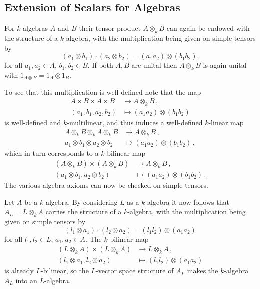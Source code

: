 \subsection{Extension of Scalars for Algebras}


\begin{fluff}
  For $k$-algebras $A$ and $B$ their tensor product $A \otimes_k B$ can again be endowed with the structure of a $k$-algebra, with the multiplication being given on simple tensors by
  \[
      (a_1 \otimes b_1) \cdot (a_2 \otimes b_2)
    = (a_1 a_2) \otimes (b_1 b_2).
  \]
  for all $a_1, a_2 \in A$, $b_1, b_2 \in B$.
  If both $A, B$ are unital then $A \otimes_k B$ is again unital with $1_{A \otimes B} = 1_A \otimes 1_B$.
  
  To see that this multiplication is well-defined note that the map
  \begin{align*}
              A \times B \times A \times B
    &\to      A \otimes_k B \,, \\
              (a_1, b_1, a_2, b_2)
    &\mapsto  (a_1 a_2) \otimes (b_1 b_2)
  \end{align*}
  is well-defined and $k$-multilinear, and thus induces a well-defined $k$-linear map
  \begin{align*}
              A \otimes_k B \otimes_k A \otimes_k B
    &\to      A \otimes_k B \,, \\
              a_1 \otimes b_1 \otimes a_2 \otimes b_2
    &\mapsto  (a_1 a_2) \otimes (b_1 b_2) \,,
  \end{align*}
  which in turn corresponds to a $k$-bilinear map
  \begin{align*}
              (A \otimes_k B) \times (A \otimes_k B)
    &\to      A \otimes_k B \,, \\
              (a_1 \otimes b_1, a_2 \otimes b_2)
    &\mapsto  (a_1 a_2) \otimes (b_1 b_2) \,.
  \end{align*}
  The various algebra axioms can now be checked on simple tensors.
\end{fluff}


\begin{fluff}
  Let $A$ be a $k$-algebra.
  By considering $L$ as a $k$-algebra it now follows that $A_L = L \otimes_k A$ carries the structure of a $k$-algebra, with the multiplication being given on simple tensors by
  \[
      (l_1 \otimes a_1) \cdot (l_2 \otimes a_2)
    = (l_1 l_2) \otimes (a_1 a_2)
  \]
  for all $l_1, l_2 \in L$, $a_1, a_2 \in A$.
  The $k$-bilinear map
  \begin{align*}
              (L\otimes_k A) \times (L \otimes_k A)
    &\to      L \otimes_k A \,, \\
              (l_1 \otimes a_1, l_2 \otimes a_2)
    &\mapsto  (l_1 l_2) \otimes (a_1 a_2)
  \end{align*}
  is already $L$-bilinear, so the $L$-vector space structure of $A_L$ makes the $k$-algebra $A_L$ into an $L$-algebra.
\end{fluff}


